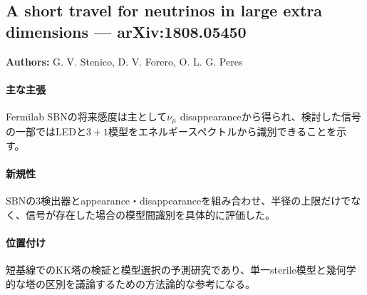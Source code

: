 \subsection{A short travel for neutrinos in large extra dimensions --- arXiv:1808.05450}

\textbf{Authors:} G. V. Stenico, D. V. Forero, O. L. G. Peres

\paragraph{主な主張}
Fermilab SBNの将来感度は主として$\nu_\mu$ disappearanceから得られ、検討した信号の一部ではLEDと$3+1$模型をエネルギースペクトルから識別できることを示す\cite{Stenico:2018SBNLED}。

\paragraph{新規性}
SBNの3検出器とappearance・disappearanceを組み合わせ、半径の上限だけでなく、信号が存在した場合の模型間識別を具体的に評価した。

\paragraph{位置付け}
短基線でのKK塔の検証と模型選択の予測研究であり、単一sterile模型と幾何学的な塔の区別を議論するための方法論的な参考になる。
